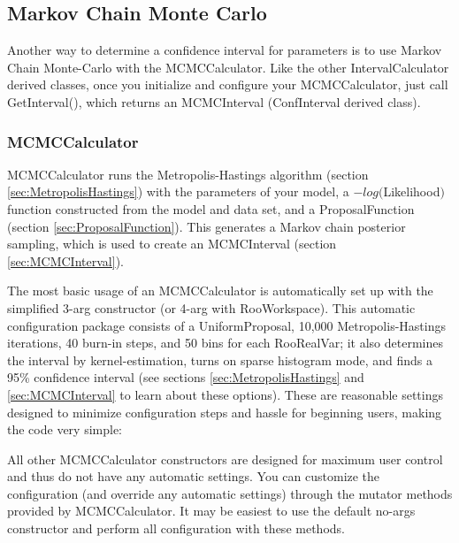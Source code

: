 \documentclass[11pt]{article}
\begin{document}
\subsection{Markov Chain Monte Carlo}

	Another way to determine a confidence interval for parameters is to use Markov Chain Monte-Carlo with the MCMCCalculator.  Like the other IntervalCalculator derived classes, once you initialize and configure your MCMCCalculator, just call GetInterval(), which returns an MCMCInterval (ConfInterval derived class).
	
	\subsubsection{MCMCCalculator}
	\label{sec:MCMCCalculator}
	
	MCMCCalculator runs the Metropolis-Hastings algorithm (section \ref{sec:MetropolisHastings}) with the parameters of your model, a $-log($Likelihood$)$ function constructed from the model and data set, and a ProposalFunction (section \ref{sec:ProposalFunction}).  This generates a Markov chain posterior sampling, which is used to create an MCMCInterval (section \ref{sec:MCMCInterval}).
	
	The most basic usage of an MCMCCalculator is automatically set up with the simplified 3-arg constructor (or 4-arg with RooWorkspace).  This automatic configuration package consists of  a UniformProposal, 10,000 Metropolis-Hastings iterations, 40 burn-in steps, and 50 bins for each RooRealVar; it also determines the interval by kernel-estimation, turns on sparse histogram mode, and finds a 95\% confidence interval (see sections \ref{sec:MetropolisHastings} and \ref{sec:MCMCInterval} to learn about these options).  These are reasonable settings designed to minimize configuration steps and hassle for beginning users, making the code very simple:
	
	
	
	All other MCMCCalculator constructors are designed for maximum user control and thus do not have any automatic settings.  You can customize the configuration (and override any automatic settings) through the mutator methods provided by MCMCCalculator.  It may be easiest to use the default no-args constructor and perform all configuration with these methods.
	
	
	
\end{document}
